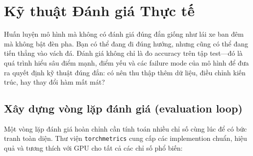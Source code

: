 \section{Kỹ thuật Đánh giá Thực tế}
\label{sec:evaluation}

Huấn luyện mô hình mà không có đánh giá đúng đắn giống như lái xe ban đêm mà không bật đèn pha. Bạn có thể đang đi đúng hướng, nhưng cũng có thể đang tiến thẳng vào vách đá. Đánh giá không chỉ là đo accuracy trên tập test---đó là quá trình hiểu sâu điểm mạnh, điểm yếu và các failure mode của mô hình để đưa ra quyết định kỹ thuật đúng đắn: có nên thu thập thêm dữ liệu, điều chỉnh kiến trúc, hay thay đổi hàm mất mát?

\subsection{Xây dựng vòng lặp đánh giá (evaluation loop)}
\label{subsec:eval_loop}

Một vòng lặp đánh giá hoàn chỉnh cần tính toán nhiều chỉ số cùng lúc để có bức tranh toàn diện. Thư viện \texttt{torchmetrics} cung cấp các implemention chuẩn, hiệu quả và tương thích với GPU cho tất cả các chỉ số phổ biến:

